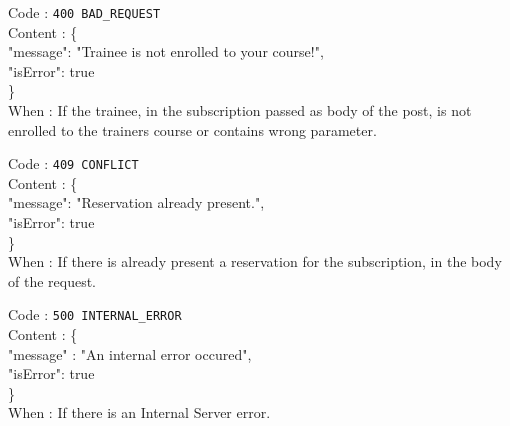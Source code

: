 \begin{itemize}
	Code : \texttt{400 BAD\_REQUEST}\\
	Content : \{\\
	\tab "message": "Trainee is not enrolled to your course!",\\
	\tab "isError": true\\
	\tab \}\\
	When : If the trainee, in the subscription passed as body of the post, is not enrolled to the trainers course or contains wrong parameter.
	
	Code : \texttt{409 CONFLICT}\\
	Content : \{ \\
	\tab "message": "Reservation already present.",\\
	\tab "isError": true \\
	\tab \}\\
	When : If there is already present a reservation for the subscription, in the body of the request.
				
	Code : \texttt{500 INTERNAL\_ERROR}\\
	Content : \{ \\
	\tab "message" : "An internal error occured",\\
	\tab "isError": true \\
	\tab \}\\
	When : If there is an Internal Server error.\\
\end{itemize}
